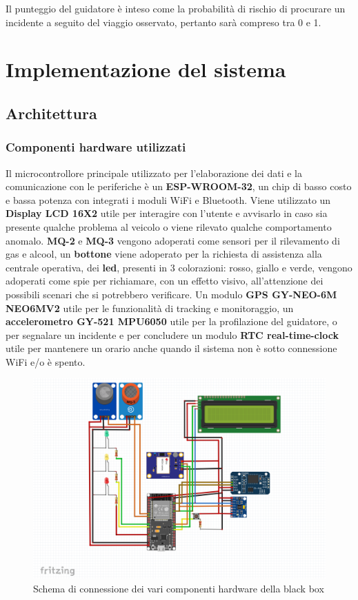 \documentclass[12pt, a4paper, italian]{report}
\numberwithin{figure}{chapter}
\numberwithin{table}{chapter}
\begin{document}
Il punteggio del guidatore è inteso come la probabilità di rischio di procurare un incidente a seguito del viaggio osservato, pertanto sarà compreso tra 0 e 1.

\chapter{Implementazione del sistema}
\section{Architettura}

\subsection{Componenti hardware utilizzati}

Il microcontrollore principale utilizzato per l'elaborazione dei dati e la comunicazione con le periferiche è un \textbf{ESP-WROOM-32}, un chip di basso costo e bassa potenza con integrati i moduli WiFi e Bluetooth. 
Viene utilizzato un \textbf{Display LCD 16X2} utile per interagire con l'utente e avvisarlo in caso sia presente qualche problema al veicolo o viene rilevato qualche comportamento anomalo. \textbf{MQ-2} e \textbf{MQ-3} vengono adoperati come sensori per il rilevamento di gas e alcool, un \textbf{bottone} viene adoperato per la richiesta di assistenza alla centrale operativa, dei \textbf{led}, presenti in 3 colorazioni: rosso, giallo e verde, vengono adoperati come spie per richiamare, con un effetto visivo, all'attenzione dei possibili scenari che si potrebbero verificare. 
Un modulo \textbf{GPS GY-NEO-6M NEO6MV2} utile per le funzionalità di tracking e monitoraggio, un \textbf{accelerometro GY-521 MPU6050} utile per la profilazione del guidatore, o per segnalare un incidente e per concludere un modulo \textbf{RTC real-time-clock} utile per mantenere un orario anche quando il sistema non è sotto connessione WiFi e/o è spento.

\begin{figure}[h]
  \centering
  \includegraphics[width=12cm]{circuito_logo.png}
  \caption{Schema di connessione dei vari componenti hardware della black box}
  \label{fig:schema_circuito}
\end{figure}
\end{document}
